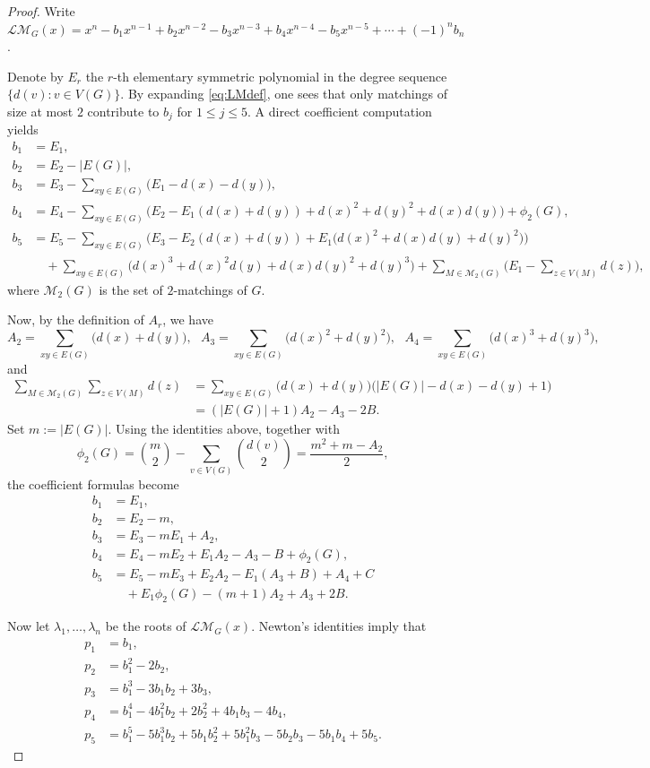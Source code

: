 \documentclass[11pt]{amsart}
\numberwithin{equation}{section}
\newcommand{\LM}{\mathscr{LM}}
\newcommand{\calM}{\mathcal{M}}
\begin{document}
\begin{proof}
Write $\LM_G(x)=x^n-b_1x^{n-1}+b_2x^{n-2}-b_3x^{n-3}+b_4x^{n-4}-b_5x^{n-5}+\cdots +(-1)^nb_n$.

Denote by $E_r$ the $r$-th elementary symmetric polynomial in the degree sequence \\
$\{d(v):v\in V(G)\}$. By expanding \eqref{eq:LMdef}, one sees that only matchings of 
size at most $2$ contribute to $b_j$ for $1\le j\le 5$. A direct coefficient computation yields
\begin{align*}
b_1 &= E_1,\\
b_2 &= E_2-|E(G)|,\\ 
b_3 &= E_3-\sum_{xy\in E(G)} \bigl(E_1-d(x)-d(y)\bigr),\\
b_4 & = E_4-\sum_{xy\in E(G)}\bigl(E_2-E_1(d(x)+d(y))
+d(x)^2+d(y)^2+d(x)d(y)\bigr) + \phi_2(G), \\
b_5 & = E_5-\sum_{xy\in E(G)} \!\bigl(E_3-E_2(d(x)+d(y))
+E_1\bigl(d(x)^2+d(x)d(y)+d(y)^2\bigr)\bigr) \\
& \quad+\sum_{xy\in E(G)}\! \bigl(d(x)^3+d(x)^2d(y)+d(x)d(y)^2+d(y)^3\bigr) 
+\sum_{M\in \calM_2(G)}\!\! \bigg(E_1-\sum_{z\in V(M)} d(z)\bigg),
\end{align*}
where $\calM_2(G)$ is the set of $2$-matchings of $G$.

Now, by the definition of $A_r$, we have
\[
A_2 = \sum_{xy\in E(G)}\! \bigl(d(x)+d(y)\bigr),~~~ 
A_3 = \sum_{xy\in E(G)}\! \bigl(d(x)^2+d(y)^2\bigr),~~~
A_4 = \sum_{xy\in E(G)}\! \bigl(d(x)^3+d(y)^3\bigr), 
\]
and
\begin{align*}
\sum_{M\in \calM_2(G)} \sum_{z\in V(M)} d(z)
& = \sum_{xy\in E(G)} \bigl(d(x) + d(y)\bigr) \bigl(|E(G)|-d(x)-d(y)+1\bigr) \\
& = (|E(G)|+1) A_2 - A_3 - 2B.
\end{align*}
Set $m:=|E(G)|$. Using the identities above, together with
\[
\phi_2(G)=\binom{m}{2}-\sum_{v\in V(G)}\binom{d(v)}{2}
=\frac{m^2+m-A_2}{2},
\]
the coefficient formulas become 
\begin{align*}
b_1 &= E_1,\\ 
b_2 &=E_2-m,\\ 
b_3 &=E_3-mE_1+A_2,\\
b_4 & = E_4-mE_2+E_1A_2-A_3-B+\phi_2(G), \\
b_5 & = E_5-mE_3+E_2A_2-E_1(A_3+B)+A_4+C \\
& \quad +E_1\phi_2(G)-(m+1)A_2+A_3+2B.
\end{align*}

Now let $\lambda_1,\dots,\lambda_n$ be the roots of $\LM_G(x)$. 
Newton's identities imply that
\begin{align*}
p_1 &= b_1,\\ 
p_2 &=b_1^2-2b_2,\\ 
p_3 &=b_1^3-3b_1b_2+3b_3,\\
p_4 & = b_1^4-4b_1^2b_2+2b_2^2+4b_1b_3-4b_4, \\
p_5 & = b_1^5-5b_1^3b_2+5b_1b_2^2+5b_1^2b_3-5b_2b_3-5b_1b_4+5b_5.
\end{align*}


\end{proof}
\end{document}
